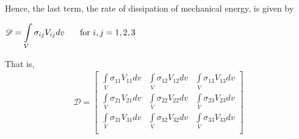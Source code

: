 \documentclass[12pt, a4paper]{article}
\theoremstyle{definition}
\theoremstyle{remark}
\theoremstyle{definition}
\newcommand{\?}{\stackrel{?}{=}}
\begin{document}
\noindent Hence, the last term, the rate of dissipation of mechanical energy, is given by
\begin{center}
$\mathscr{D} = \displaystyle\int\limits_{V} {\sigma}_{ij} {V}_{ij}dv \hspace{0.25in} \text{for } i,j = 1, 2, 3$ \\
\end{center}
That is,
\begin{align*}
\mathscr{D} = 
\begin{bmatrix}
\int\limits_{V} {\sigma}_{11} {V}_{11}dv & \int\limits_{V} {\sigma}_{12} {V}_{12}dv  & \int\limits_{V} {\sigma}_{13} {V}_{13}dv \\
 \int\limits_{V} {\sigma}_{21} {V}_{21}dv & \int\limits_{V} {\sigma}_{22} {V}_{22}dv  & \int\limits_{V} {\sigma}_{23} {V}_{23}dv \\
 \int\limits_{V} {\sigma}_{31} {V}_{31}dv  & \int\limits_{V} {\sigma}_{32} {V}_{32}dv  & \int\limits_{V} {\sigma}_{33} {V}_{33}dv \\
\end{bmatrix}
\end{align*}
\end{document}
